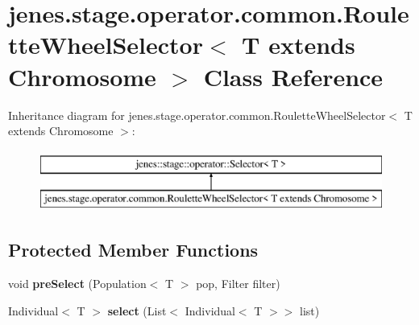 \hypertarget{classjenes_1_1stage_1_1operator_1_1common_1_1_roulette_wheel_selector_3_01_t_01extends_01_chromosome_01_4}{\section{jenes.\-stage.\-operator.\-common.\-Roulette\-Wheel\-Selector$<$ T extends Chromosome $>$ Class Reference}
\label{classjenes_1_1stage_1_1operator_1_1common_1_1_roulette_wheel_selector_3_01_t_01extends_01_chromosome_01_4}
}
Inheritance diagram for jenes.\-stage.\-operator.\-common.\-Roulette\-Wheel\-Selector$<$ T extends Chromosome $>$\-:\begin{figure}[H]
\begin{center}
\leavevmode
\includegraphics[height=2.000000cm]{classjenes_1_1stage_1_1operator_1_1common_1_1_roulette_wheel_selector_3_01_t_01extends_01_chromosome_01_4}
\end{center}
\end{figure}
\subsection*{Protected Member Functions}
\begin{DoxyCompactItemize}
\item 
\hypertarget{classjenes_1_1stage_1_1operator_1_1common_1_1_roulette_wheel_selector_3_01_t_01extends_01_chromosome_01_4_a13a6b76fa77779367d05a063ff6191bf}{void {\bfseries pre\-Select} (Population$<$ T $>$ pop, Filter filter)}\label{classjenes_1_1stage_1_1operator_1_1common_1_1_roulette_wheel_selector_3_01_t_01extends_01_chromosome_01_4_a13a6b76fa77779367d05a063ff6191bf}

\item 
\hypertarget{classjenes_1_1stage_1_1operator_1_1common_1_1_roulette_wheel_selector_3_01_t_01extends_01_chromosome_01_4_ad74c66e053cb97c75ce8a9f78a8208e5}{Individual$<$ T $>$ {\bfseries select} (List$<$ Individual$<$ T $>$$>$ list)}\label{classjenes_1_1stage_1_1operator_1_1common_1_1_roulette_wheel_selector_3_01_t_01extends_01_chromosome_01_4_ad74c66e053cb97c75ce8a9f78a8208e5}

\end{DoxyCompactItemize}


